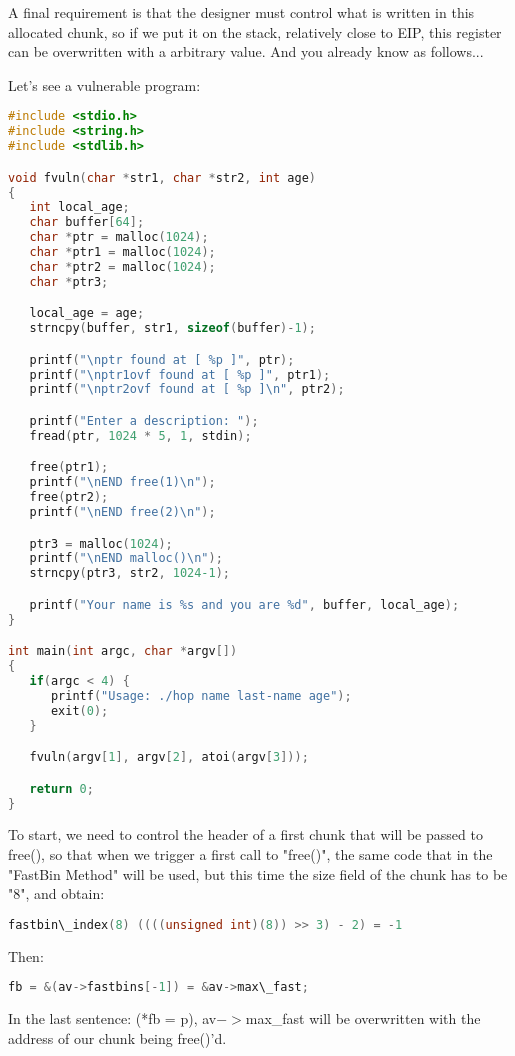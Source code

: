 \documentclass[12pt]{article}
\begin{document}
A final requirement is that the designer must control what is written in
this allocated chunk, so if we put it on the stack, relatively close to
EIP, this register can be overwritten with a arbitrary value. And you
already know as follows...

Let's see a vulnerable program:

\begin{lstlisting}[language=C]
#include <stdio.h>
#include <string.h>
#include <stdlib.h>

void fvuln(char *str1, char *str2, int age)
{
   int local_age;
   char buffer[64];
   char *ptr = malloc(1024);
   char *ptr1 = malloc(1024);
   char *ptr2 = malloc(1024);
   char *ptr3;

   local_age = age;
   strncpy(buffer, str1, sizeof(buffer)-1);

   printf("\nptr found at [ %p ]", ptr);
   printf("\nptr1ovf found at [ %p ]", ptr1);
   printf("\nptr2ovf found at [ %p ]\n", ptr2);

   printf("Enter a description: ");
   fread(ptr, 1024 * 5, 1, stdin); 

   free(ptr1);
   printf("\nEND free(1)\n");
   free(ptr2);
   printf("\nEND free(2)\n");

   ptr3 = malloc(1024);
   printf("\nEND malloc()\n");
   strncpy(ptr3, str2, 1024-1);

   printf("Your name is %s and you are %d", buffer, local_age);
}

int main(int argc, char *argv[])
{
   if(argc < 4) {
      printf("Usage: ./hop name last-name age");
      exit(0);
   }

   fvuln(argv[1], argv[2], atoi(argv[3]));

   return 0;
}
\end{lstlisting}


To start, we need to control the header of a first chunk that will be
passed to free(), so that when we trigger a first call to "free()", the
same code that in the "FastBin Method" will be used, but this time the
size field of the chunk has to be "8", and obtain:
\begin{lstlisting}[language=C]
   fastbin\_index(8) ((((unsigned int)(8)) >> 3) - 2) = -1
\end{lstlisting}

Then:
\begin{lstlisting}[language=C]
   fb = &(av->fastbins[-1]) = &av->max\_fast;
\end{lstlisting}

In the last sentence: (*fb = p), av$->$max\_fast will be overwritten with
the address of our chunk being free()'d.
\newline
\end{document}
